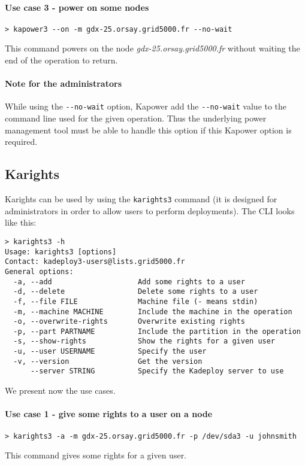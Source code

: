 \documentclass[a4wide,10pt,oneside]{book}
\begin{document}
\paragraph{Use case 3 - power on some nodes}
\begin{verbatim}
> kapower3 --on -m gdx-25.orsay.grid5000.fr --no-wait
\end{verbatim}
This command powers on the node \textit{gdx-25.orsay.grid5000.fr} without waiting the end of the operation to return.

\paragraph{Note for the administrators}
While using the \texttt{-{}-no-wait} option, Kapower add the \texttt{-{}-no-wait} value to the command line used for the given operation. Thus the underlying power management tool must be able to handle this option if this Kapower option is required.


\subsection{Karights}\label{sec:karights}
Karights can be used by using the \texttt{karights3} command (it is designed for administrators in order to allow users to perform deployments). The CLI looks like this:
\begin{small}
\begin{verbatim}
> karights3 -h
Usage: karights3 [options]
Contact: kadeploy3-users@lists.grid5000.fr
General options:
  -a, --add                    Add some rights to a user
  -d, --delete                 Delete some rights to a user
  -f, --file FILE              Machine file (- means stdin)
  -m, --machine MACHINE        Include the machine in the operation
  -o, --overwrite-rights       Overwrite existing rights
  -p, --part PARTNAME          Include the partition in the operation
  -s, --show-rights            Show the rights for a given user
  -u, --user USERNAME          Specify the user
  -v, --version                Get the version
      --server STRING          Specify the Kadeploy server to use
\end{verbatim}
\end{small}

We present now the use cases.
\paragraph{Use case 1 - give some rights to a user on a node}
\begin{verbatim}
> karights3 -a -m gdx-25.orsay.grid5000.fr -p /dev/sda3 -u johnsmith
\end{verbatim}
This command gives some rights for a given user.
\end{document}
